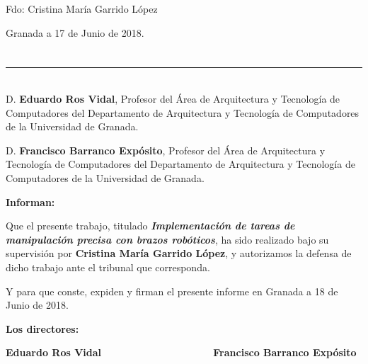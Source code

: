 \vspace{6cm}

\noindent Fdo: Cristina María Garrido López

\vspace{2cm}

\begin{flushright}
Granada a 17 de Junio de 2018.
\end{flushright}

\newpage
\chapter*{}
\thispagestyle{empty}

\noindent\rule[-1ex]{\textwidth}{2pt}\\[4.5ex]

D. \textbf{Eduardo Ros Vidal}, Profesor del Área de Arquitectura y Tecnología de Computadores del Departamento de Arquitectura y Tecnología de Computadores de la Universidad de Granada.

\vspace{0.5cm}

D. \textbf{Francisco Barranco Expósito}, Profesor del Área de Arquitectura y Tecnología de Computadores del Departamento de Arquitectura y Tecnología de Computadores de la Universidad de Granada.


\vspace{0.5cm}

\textbf{Informan:}

\vspace{0.5cm}

Que el presente trabajo, titulado \textit{\textbf{Implementación de tareas de manipulación precisa con brazos robóticos}},
ha sido realizado bajo su supervisión por \textbf{Cristina María Garrido López}, y autorizamos la defensa de dicho trabajo ante el tribunal
que corresponda.

\vspace{0.5cm}

Y para que conste, expiden y firman el presente informe en Granada a 18 de Junio de 2018.

\vspace{1cm}

\textbf{Los directores:}

\vspace{5cm}

\noindent \textbf{Eduardo Ros Vidal \ \ \ \ \ \ \ \ \ \ \ \ \ \ \ \ \ \ \ Francisco Barranco Expósito}

\newpage
